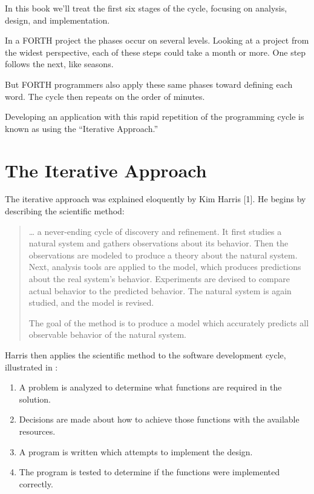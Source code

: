 \noindent In this book we'll treat the first six stages of the cycle,
focusing on analysis, design, and implementation.

In a FORTH project the phases occur on several levels. Looking at a
project from the widest perspective, each of these steps could take a
month or more.  One step follows the next, like seasons.


But FORTH programmers also apply these same phases toward
defining each word. The cycle then repeats on the order of minutes.

Developing an application with this rapid repetition of the
programming cycle is known as using the ``Iterative Approach.''

\section{The Iterative Approach}

\noindent The iterative approach was explained eloquently by Kim
Harris {[}1{]}. He begins by describing the scientific method:

\begin{quotation}
\noindent \dots{} a never-ending cycle of discovery and refinement. It
first studies a natural system and gathers observations about its
behavior. Then the observations are modeled to produce a theory about
the natural system.  Next, analysis tools are applied to the model,
which produces predictions about the real system's behavior.
Experiments are devised to compare actual behavior to the predicted
behavior. The natural system is again studied, and the model is
revised.

The goal of the method is to produce a model which accurately predicts all
observable behavior of the natural system.
\end{quotation}

\noindent Harris then applies the scientific method to the software development
cycle, illustrated in :


\begin{enumerate}

\item A problem is analyzed to determine what functions are required
in the solution.

\item Decisions are made about how to achieve those functions with the
available resources.

\item A program is written which attempts to implement the design.
\item The program is tested to determine if the functions were
implemented correctly.

\end{enumerate}

